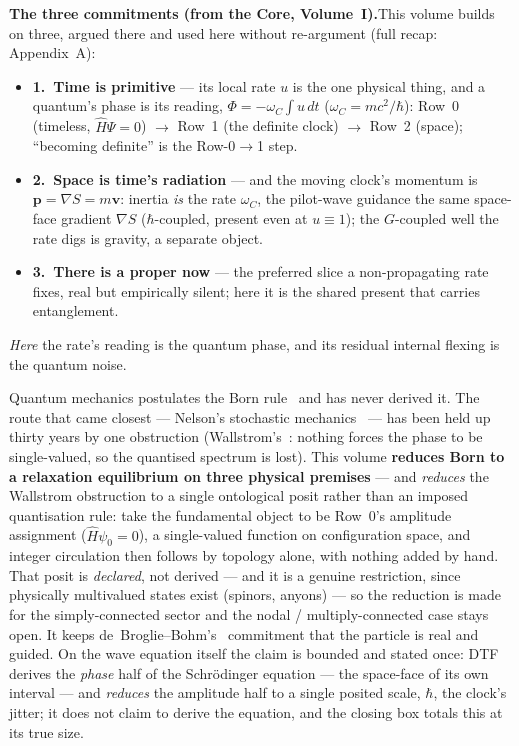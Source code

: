 \documentclass[11pt]{article}
\begin{document}
\bigskip

\begin{tcolorbox}[keybox]
\textbf{The three commitments (from the Core, Volume~I).}\enspace This volume builds on three, argued there
and used here without re-argument (full recap: Appendix~A):
\begin{itemize}[leftmargin=1.4em,itemsep=1pt,topsep=3pt]
  \item \textbf{1.\ Time is primitive} --- its local rate $u$ is the one physical thing, and a quantum's
    phase is its reading, $\Phi=-\omega_C\!\int u\,dt$ ($\omega_C=mc^2/\hbar$): Row~0 (timeless,
    $\hat H\Psi=0$) $\to$ Row~1 (the definite clock) $\to$ Row~2 (space); ``becoming definite'' is the
    Row-0$\to$1 step.
  \item \textbf{2.\ Space is time's radiation} --- and the moving clock's momentum is
    $\mathbf p=\nabla S=m\mathbf v$: inertia \emph{is} the rate $\omega_C$, the pilot-wave guidance the same
    space-face gradient $\nabla S$ ($\hbar$-coupled, present even at $u\equiv1$); the $G$-coupled well the
    rate digs is gravity, a separate object.
  \item \textbf{3.\ There is a proper now} --- the preferred slice a non-propagating rate fixes, real but
    empirically silent; here it is the shared present that carries entanglement.
\end{itemize}
\noindent\emph{Here} the rate's reading is the quantum phase, and its residual internal flexing is the
quantum noise.
\end{tcolorbox}

\medskip
\noindent Quantum mechanics postulates the Born rule~\cite{Born1926} and has never derived it. The route
that came closest --- Nelson's stochastic mechanics~\cite{Nelson1966} --- has been held up thirty years by
one obstruction (Wallstrom's~\cite{Wallstrom1994}: nothing forces the phase to be single-valued, so the
quantised spectrum is lost). This volume \textbf{reduces Born to a relaxation equilibrium on three
physical premises} --- and \emph{reduces} the Wallstrom obstruction to a single ontological posit rather
than an imposed quantisation rule: take the fundamental object to be Row~0's amplitude assignment
($\hat H\psi_0=0$), a single-valued function on configuration space, and integer circulation then follows
by topology alone, with nothing added by hand. That posit is \emph{declared}, not derived --- and it is a
genuine restriction, since physically multivalued states exist (spinors, anyons) --- so the reduction is
made for the simply-connected sector and the nodal / multiply-connected case stays open. It keeps de~Broglie--Bohm's~\cite{Bohm1952}
commitment that the particle is real and guided. On the wave equation itself the claim is bounded and
stated once: DTF derives the \emph{phase} half of the Schr\"odinger equation --- the space-face of its own
interval --- and \emph{reduces} the amplitude half to a single posited scale, $\hbar$, the clock's jitter;
it does not claim to derive the equation, and the closing box totals this at its true size.
\end{document}
